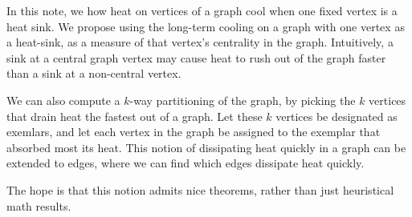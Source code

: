 In this note, we how heat on vertices of a graph cool when
one fixed vertex is a heat sink.
We propose using the long-term cooling on a graph with one vertex
as a heat-sink, as a measure
of that vertex's centrality in the graph.
Intuitively, a sink at a central graph
vertex may cause heat to rush
out of the graph faster than a sink at a non-central
vertex.

We can also compute a $k$-way
partitioning of the graph, by picking the $k$ vertices that drain
heat the fastest out of a graph. Let these $k$ vertices be
designated as exemlars, and let
each vertex in the graph be assigned to the
exemplar that absorbed most its heat.
This notion of dissipating heat quickly in a graph can be
extended to edges, where we can find which edges dissipate heat
quickly. 

The hope is that this notion admits nice theorems, rather than
just heuristical math results.

